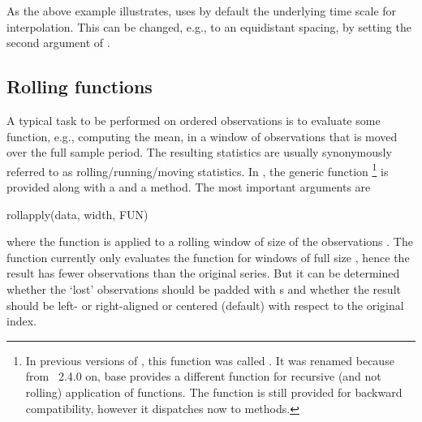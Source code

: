 \documentclass{Z}
\begin{document}
As the above example illustrates,  uses by default
the underlying time scale for interpolation. This can be changed, e.g.,
to an equidistant spacing, by setting the second argument of
.

\subsection{Rolling functions}
\label{sec:rolling}

A typical task to be performed on ordered observations is to evaluate some
function, e.g., computing the mean, in a window of observations that is moved
over the full sample period. The resulting statistics are usually synonymously referred to
as rolling/running/moving statistics. In , the generic function
\footnote{In previous versions of , this function was called
  . It was renamed because from ~2.4.0 on, base 
  provides a different function  for recursive (and not rolling) application
  of functions. The function  is still provided for backward compatibility,
  however it dispatches now to  methods.}
is provided along with a  and a  method. The most important arguments
are

\begin{Scode}
rollapply(data, width, FUN)
\end{Scode}

where the function  is applied to a rolling window of size 
of the observations . The function  currently only evaluates
the function for windows of full size , hence the result has 
fewer observations than the original series. But it can be determined whether the `lost'
observations should be padded with s and whether the result should be left-
or right-aligned or centered (default) with respect to the original index.
\end{document}
